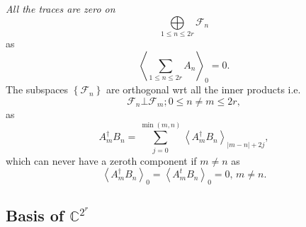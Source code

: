 \documentclass[aps,preprint]{revtex4}%
\begin{document}
\emph{All the traces are zero on}
\begin{equation}%
{\displaystyle\bigoplus\limits_{1\leq n\leq2r}}
\mathcal{F}_{n}%
\end{equation}
as
\begin{equation}
\left\langle \sum_{1\leq n\leq2r}A_{n}\right\rangle _{0}=0.
\end{equation}
The subspaces $\left\{  \mathcal{F}_{n}\right\}  $ are orthogonal wrt all the
inner products i.e.
\begin{equation}
\mathcal{F}_{n}\bot\mathcal{F}_{m};0\leq n\neq m\leq2r,
\end{equation}
as
\begin{equation}
A_{m}^{\dagger}B_{n}=\sum_{j=0}^{\min\left(  m,n\right)  }\left\langle
A_{m}^{\dagger}B_{n}\right\rangle _{\left\vert m-n\right\vert +2j},
\end{equation}
which can never have a zeroth component if $m\neq n$ as
\begin{equation}
\left\langle A_{m}^{\dagger}B_{n}\right\rangle _{0}=\left\langle A_{m}%
^{t}B_{n}\right\rangle _{0}=0,\,m\neq n.
\end{equation}


\subsection{Basis of $\mathbb{C}^{2^{r}}$}
\end{document}
